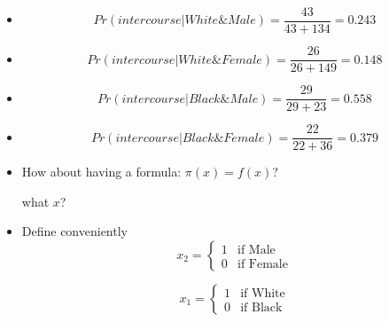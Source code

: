 \documentclass[12pt]{beamer}
\begin{document}
\begin{frame}
  \begin{itemize}
    \item<1->
    \begin{equation}
    Pr(intercourse|White \& Male)=\frac{43}{43+134}=0.243
    \end{equation}
    \item<2->
    \begin{equation}
    Pr(intercourse|White \& Female)=\frac{26}{26+149}=0.148
    \end{equation}
  \end{itemize}
\end{frame}
\begin{frame}
  \begin{itemize}
    \item<1->
    \begin{equation}
    Pr(intercourse|Black \& Male)=\frac{29}{29+23}=0.558
    \end{equation}
    \item<2->
    \begin{equation}
    Pr(intercourse|Black \& Female)=\frac{22}{22+36}=0.379
    \end{equation}
  \end{itemize}
\end{frame}



\begin{frame}
  \begin{itemize}
    \item<1-> How about having a formula: $\pi (x)=f(x)$?

    what $x$?
    \item<2-> Define conveniently
    \begin{equation*}
     x_{2}=\left\{
      \begin{array}{rl}
      1  &  \text{if Male}\\
      0  &  \text{if Female}
      \end{array} \right.
    \end{equation*}

  \begin{equation*}
     x_{1}=\left\{
      \begin{array}{rl}
      1  &  \text{if White}\\
      0  &  \text{if Black}
      \end{array} \right.
    \end{equation*}
  \end{itemize}
\end{frame}
\end{document}
